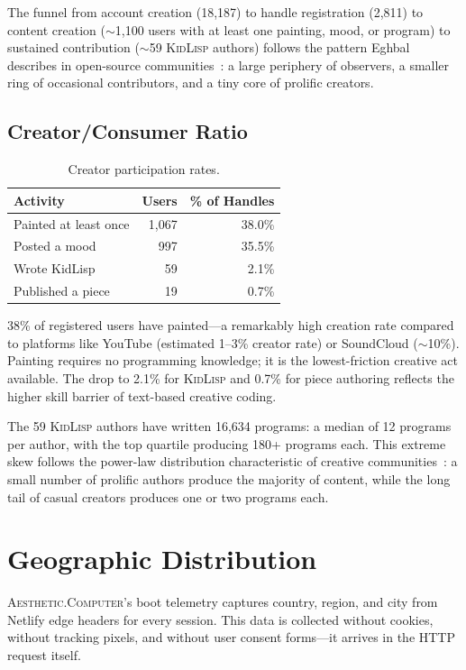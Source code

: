 \documentclass[10pt,letterpaper,twocolumn]{article}
\newcommand{\ac}{\textsc{Aesthetic.Computer}}
\newcommand{\kl}{\textsc{KidLisp}}
\begin{document}
The funnel from account creation (18,187) to handle registration (2,811) to content creation ($\sim$1,100 users with at least one painting, mood, or program) to sustained contribution ($\sim$59 \kl{} authors) follows the pattern Eghbal describes in open-source communities~\citep{eghbal2020working}: a large periphery of observers, a smaller ring of occasional contributors, and a tiny core of prolific creators.

\subsection{Creator/Consumer Ratio}

\begin{table}[h]
\small
\centering
\begin{tabularx}{\columnwidth}{Xrr}
\toprule
\textbf{Activity} & \textbf{Users} & \textbf{\% of Handles} \\
\midrule
Painted at least once & 1,067 & 38.0\% \\
Posted a mood & 997 & 35.5\% \\
Wrote KidLisp & 59 & 2.1\% \\
Published a piece & 19 & 0.7\% \\
\bottomrule
\end{tabularx}
\caption{Creator participation rates.}
\label{tab:creators}
\end{table}

38\% of registered users have painted---a remarkably high creation rate compared to platforms like YouTube (estimated 1--3\% creator rate) or SoundCloud ($\sim$10\%). Painting requires no programming knowledge; it is the lowest-friction creative act available. The drop to 2.1\% for \kl{} and 0.7\% for piece authoring reflects the higher skill barrier of text-based creative coding.

The 59 \kl{} authors have written 16,634 programs: a median of 12 programs per author, with the top quartile producing 180+ programs each. This extreme skew follows the power-law distribution characteristic of creative communities~\citep{barabasi1999emergence}: a small number of prolific authors produce the majority of content, while the long tail of casual creators produces one or two programs each.

\section{Geographic Distribution}

\ac{}'s boot telemetry captures country, region, and city from Netlify edge headers for every session. This data is collected without cookies, without tracking pixels, and without user consent forms---it arrives in the HTTP request itself.
\end{document}
